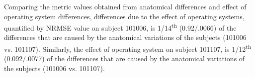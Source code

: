 Comparing the metric values obtained from anatomical differences and effect of operating system differences, differences due to the effect of operating systems, quantified by NRMSE value on subject 101006, is 1/14\textsuperscript{th} (0.92/.0066) of the differences that are caused by the anatomical variations of the subjects (101006 vs. 101107). Similarly, the effect of operating system on subject 101107, is 1/12\textsuperscript{th} (0.092/.0077) of the differences that are caused by the anatomical variations of the subjects (101006 vs. 101107).
